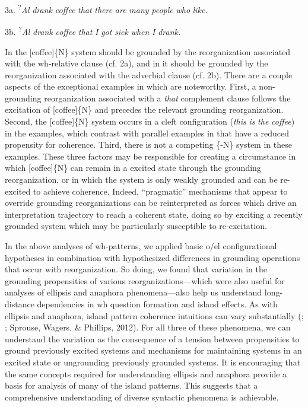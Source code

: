   3a. \textsuperscript{?}\textit{Al} \textit{drank} \textit{coffee} \textit{that} \textit{there} \textit{are} \textit{many} \textit{people} \textit{who} \textit{like.}

  3b. \textsuperscript{?}\textit{Al} \textit{drank} \textit{coffee} \textit{that} \textit{I} \textit{got} \textit{sick} \textit{when} \textit{I} \textit{drank.}

In  the [coffee]\{N\} system should be grounded by the reorganization associated with the wh-relative clause (cf. 2a), and in  it should be grounded by the reorganization associated with the adverbial clause (cf. 2b). There are a couple aspects of the exceptional examples in  which are noteworthy. First, a non-grounding reorganization associated with a \textit{that} complement clause follows the excitation of [coffee]\{N\} and precedes the relevant grounding reorganization. Second, the [coffee]\{N\} system occurs in a cleft configuration (\textit{this} \textit{is} \textit{the} \textit{coffee}) in the  examples, which contrast with parallel examples in  that have a reduced propensity for coherence. Third, there is not a competing \{-N\} system in these examples. These three factors may be responsible for creating a circumstance in which [coffee]\{N\} can remain in a excited state through the grounding reorganization, or in which the system is only weakly grounded and can be re-excited to achieve coherence. Indeed, “pragmatic” mechanisms that appear to override grounding reorganizations can be reinterpreted as forces which drive an interpretation trajectory to reach a coherent state, doing so by exciting a recently grounded system which may be particularly susceptible to re-excitation.

In the above analyses of wh-patterns, we applied basic o/el configurational hypotheses in combination with hypothesized differences in grounding operations that occur with reorganization. So doing, we found that variation in the grounding propensities of various reorganizations—which were also useful for analyses of ellipsis and anaphora phenomena—also help us understand long-distance dependencies in wh question formation and island effects. As with ellipsis and anaphora, island pattern coherence intuitions can vary substantially (\citealt{Kluender1998}; \citealt{SprouseHornstein2013}; Sprouse, Wagers, \& Phillips, 2012). For all three of these phenomena, we can understand the variation as the consequence of a tension between propensities to ground previously excited systems and mechanisms for maintaining systems in an excited state or ungrounding previously grounded systems. It is encouraging that the same concepts required for understanding ellipsis and anaphora provide a basis for analysis of many of the island patterns. This suggests that a comprehensive understanding of diverse syntactic phenomena is achievable.

